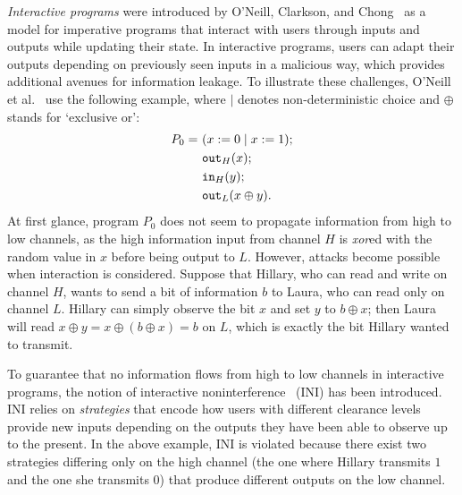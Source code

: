 \documentclass[preprint,5p,twocolumn]{elsarticle}
\begin{document}
\emph{Interactive programs} were introduced by O'Neill, Clarkson, and Chong~\cite{ONeill2006} as a model
for imperative programs that interact with users through inputs and outputs while updating
their state. In interactive programs, users can adapt their outputs depending on previously
seen inputs in a malicious way, which provides additional avenues for information leakage.
To illustrate these challenges, O'Neill et al.~\cite{ONeill2006} use the following
example, where $\mid$ denotes non-deterministic choice and $\oplus$ stands for `exclusive or':
\begin{align*}
  P_0=~&(x := 0 \mid x := 1);\\
  &\mathtt{out}_{H}(x);\\
  &\mathtt{in}_{H}(y);\\
  &\mathtt{out}_{L}(x \oplus y).
\end{align*}
At first glance, program $P_0$ does not seem to propagate information from high to low channels, as
the high information input from channel $H$ is \emph{xor}ed with the random value in $x$ before being
output to $L$. However, attacks become possible when interaction is considered. Suppose that Hillary,
who can read and write on channel $H$, wants to send a bit of information $b$ to Laura, who can read only
on channel $L$. Hillary can simply observe the bit $x$ and set $y$ to $b \oplus x$; then Laura will read
$x \oplus y = x \oplus (b \oplus x) = b$ on $L$, which is exactly the bit Hillary wanted to transmit.

To guarantee that no information flows from high to low channels in interactive programs, the notion
of interactive noninterference~\cite{ONeill2006} (INI) has been introduced. INI relies on \emph{strategies}
that encode how users with different clearance levels provide new inputs depending on the outputs
they have been able to observe up to the present. In the above example, INI is violated because
there exist two strategies differing only on the high channel (the one where Hillary transmits $1$ and the one she transmits $0$) that produce different outputs on the low channel.
\end{document}
